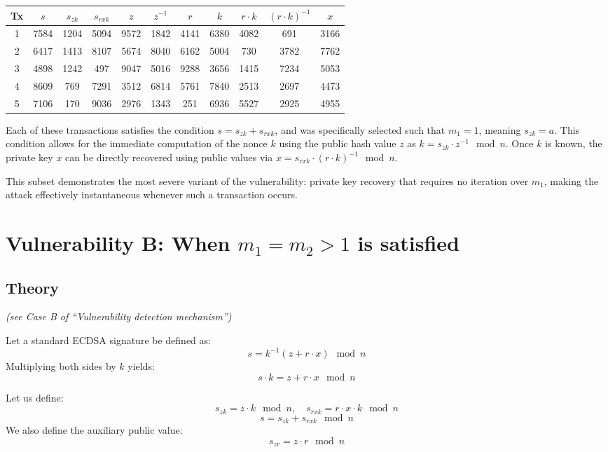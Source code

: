 \documentclass[11pt]{article}
\begin{document}
\begin{center}
\begin{tabular}{|c|c|c|c|c|c|c|c|c|c|c|}
\hline
Tx & $s$ & $s_{zk}$ & $s_{rxk}$ & $z$ & $z^{-1}$ & $r$ & $k$ & $r \cdot k$ & $(r \cdot k)^{-1}$ & $x$ \\
\hline
1 & 7584 & 1204 & 5094 & 9572 & 1842 & 4141 & 6380 & 4082 & 691 & 3166 \\
2 & 6417 & 1413 & 8107 & 5674 & 8040 & 6162 & 5004 & 730 & 3782 & 7762 \\
3 & 4898 & 1242 & 497 & 9047 & 5016 & 9288 & 3656 & 1415 & 7234 & 5053 \\
4 & 8609 & 769 & 7291 & 3512 & 6814 & 5761 & 7840 & 2513 & 2697 & 4473 \\
5 & 7106 & 170 & 9036 & 2976 & 1343 & 251 & 6936 & 5527 & 2925 & 4955 \\
\hline
\end{tabular}
\end{center}

Each of these transactions satisfies the condition \( s = s_{zk} + s_{rxk} \), and was specifically selected such that \( m_1 = 1 \), meaning \( s_{zk} = a \). This condition allows for the immediate computation of the nonce \( k \) using the public hash value \( z \) as \( k = s_{zk} \cdot z^{-1} \mod n \). Once \( k \) is known, the private key \( x \) can be directly recovered using public values via \( x = s_{rxk} \cdot (r \cdot k)^{-1} \mod n \).

This subset demonstrates the most severe variant of the vulnerability: private key recovery that requires no iteration over \( m_1 \), making the attack effectively instantaneous whenever such a transaction occurs.

\section{Vulnerability B: When \texorpdfstring{$m_1 = m_2 > 1$}{m1 = m2 > 1} is satisfied}
\subsection{Theory}
\textit{(see Case B of “Vulnerability detection mechanism”)}

Let a standard ECDSA signature be defined as:
\[
s = k^{-1}(z + r \cdot x) \mod n
\]
Multiplying both sides by $k$ yields:
\[
s \cdot k = z + r \cdot x \mod n
\]

Let us define:
\[
s_{zk} = z \cdot k \mod n, \quad s_{rxk} = r \cdot x \cdot k \mod n
\]
\[
s = s_{zk} + s_{rxk} \mod n
\]
We also define the auxiliary public value:
\[
s_{zr} = z \cdot r \mod n
\]
\end{document}
